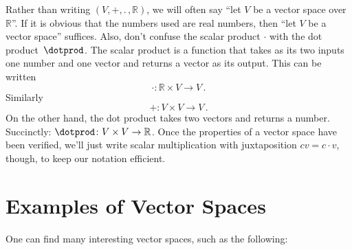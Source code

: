 \begin{remark}
Rather than writing $(V,+,.\, ,{\mathbb R})$, we will often say ``let $V$ be a vector space over ${\mathbb R}$''. If it is obvious that the numbers used are real numbers, then ``let $V$ be a vector space'' suffices.
Also, don't confuse the scalar product $\cdot$ with the dot product~$\dotprod$.  The scalar product is a function that takes as its two inputs one number and one vector  and returns a vector as its output.  This can be written 
\[\cdot \colon \mathbb{R}\times V \rightarrow V\, .\] 
Similarly
\[
+:V\times V \rightarrow V\, .
\]
On the other hand, the dot product takes two vectors and returns a number.  Succinctly: $\dotprod \colon V\times V \rightarrow \mathbb{R}$.
Once the properties of a vector space have been verified, we'll just write scalar multiplication with juxtaposition $cv=c\cdot v$, though, to keep our notation efficient. 
\end{remark}


\section{Examples of Vector Spaces}

One can  find many interesting vector spaces, such as the following:

